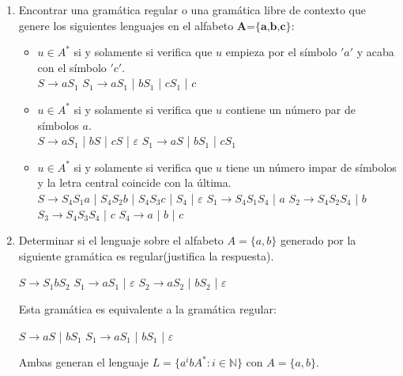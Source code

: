 \documentclass[a4paper, 11pt]{article} %
\begin{document}
\begin{enumerate}
	\item Encontrar una gramática regular o una gramática libre de contexto que genere los siguientes lenguajes en el alfabeto $\textbf{A=\{a,b,c\}}$:
		\begin{itemize}
			\item $u \in A^*$ si y solamente si verifica que $u$ empieza por el símbolo $'a'$ y acaba con el símbolo $'c'$.\\
			$S \rightarrow aS_1$ \quad $S_1 \rightarrow aS_1$ | $bS_1$ | $cS_1$ | $c$
			\item $u \in A^*$ si y solamente si verifica que $u$ contiene un número par de símbolos $a$.\\
			$S \rightarrow aS_1$ | $bS$ | $cS$ | $\varepsilon$ \quad $S_1 \rightarrow aS$ | $bS_1$ | $cS_1$
			\item $u \in A^*$ si y solamente si verifica que $u$ tiene un número impar de símbolos y la letra central coincide con la última.\\
			$S \rightarrow S_4S_1a$ | $S_4S_2b$ | $S_4S_3c$ | $S_4$ | $\varepsilon$ \quad $S_1 \rightarrow S_4S_1S_4$ | $a$ \newline $S_2 \rightarrow S_4S_2S_4$ | $b$ \quad $S_3 \rightarrow S_4S_3S_4$ | $c$ \quad $S_4 \rightarrow a$ | $b$ | $c$
		\end{itemize}
	
	\item Determinar si el lenguaje sobre el alfabeto $A=\{a,b\}$ generado por la siguiente gramática es regular(justifica la respuesta).
		\begin{center}
			$S \rightarrow S_1bS_2$ \quad $S_1 \rightarrow aS_1$ | $\varepsilon$ \quad $S_2 \rightarrow aS_2$ | $bS_2$ | $\varepsilon$
		\end{center}
		Esta gramática es equivalente a la gramática regular:
		\begin{center}
			$S \rightarrow aS$ | $bS_1$ \quad $S_1 \rightarrow aS_1$ | $bS_1$ | $\varepsilon$
		\end{center}
		Ambas generan el lenguaje $L=\{a^ibA^*: i \in \mathbb{N}\}$ con $A=\{a,b\}$.
\end{enumerate}
\end{document}
